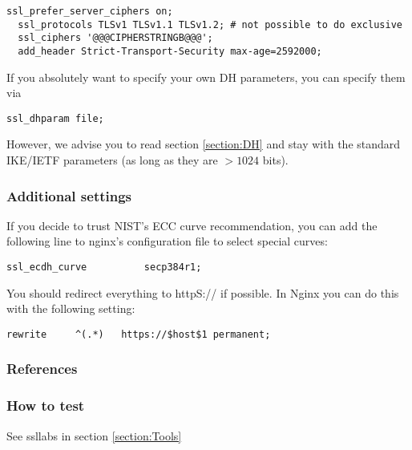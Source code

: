 \begin{lstlisting}[breaklines]
  ssl_prefer_server_ciphers on;
  ssl_protocols TLSv1 TLSv1.1 TLSv1.2; # not possible to do exclusive
  ssl_ciphers '@@@CIPHERSTRINGB@@@';
  add_header Strict-Transport-Security max-age=2592000;
\end{lstlisting}

If you absolutely want to specify your own DH parameters, you can specify them via

\begin{lstlisting}[breaklines]
  ssl_dhparam file;
\end{lstlisting}

However, we advise you to read section \ref{section:DH} and stay with the standard IKE/IETF parameters (as long as they are $ > 1024 $ bits).


\subsubsection{Additional settings}

If you decide to trust NIST's ECC curve recommendation, you can add the following line to nginx's configuration file to select special curves:

\begin{lstlisting}[breaklines]
  ssl_ecdh_curve          secp384r1;
\end{lstlisting}

You should redirect everything to httpS:// if possible. In Nginx you can do this with the following setting:

\begin{lstlisting}[breaklines]
  rewrite     ^(.*)   https://$host$1 permanent;
\end{lstlisting}


\subsubsection{References} 

\subsubsection{How to test}
See ssllabs in section \ref{section:Tools}






